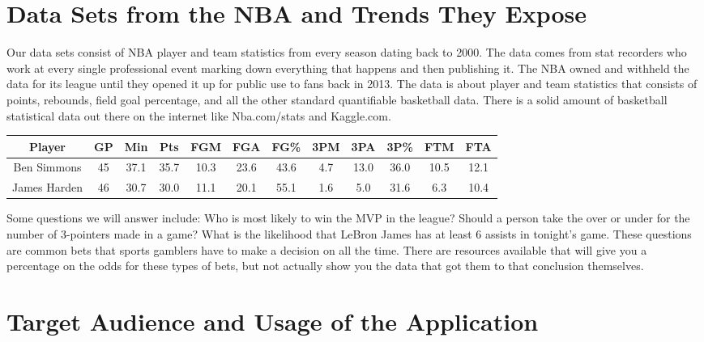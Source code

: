 \documentclass[11pt]{article}
\begin{document}
\section*{Data Sets from the NBA and Trends They Expose}

Our data sets consist of NBA player and team statistics from every season dating back to 2000. The data comes from stat recorders who work at every single professional event marking down everything that happens and then publishing it. The NBA owned and withheld the data for its league until they opened it up for public use to fans back in 2013. The data is about player and team statistics that consists of points, rebounds, field goal percentage, and all the other standard quantifiable basketball data. There is a solid amount of basketball statistical data out there on the internet like Nba.com/stats and Kaggle.com.

\begin{table}[h]
\begin{tabular}{|c|c|c|c|c|c|c|c|c|c|c|c|}
\hline
Player       & GP & Min  & Pts  & FGM  & FGA  & FG\% & 3PM & 3PA  & 3P\% & FTM  & FTA  \\ \hline
Ben Simmons  & 45 & 37.1 & 35.7 & 10.3 & 23.6 & 43.6 & 4.7 & 13.0 & 36.0 & 10.5 & 12.1 \\ \hline
James Harden & 46 & 30.7 & 30.0 & 11.1 & 20.1 & 55.1 & 1.6 & 5.0  & 31.6 & 6.3  & 10.4 \\ \hline
\end{tabular}
\end{table}

Some questions we will answer include: Who is most likely to win the MVP in the league? Should a person take the over or under for the number of 3-pointers made in a game? What is the likelihood that LeBron James has at least 6 assists in tonight's game. These questions are common bets that sports gamblers have to make a decision on all the time. There are resources available that will give you a percentage on the odds for these types of bets, but not actually show you the data that got them to that conclusion themselves.

\section*{Target Audience and Usage of the Application}
\end{document}
